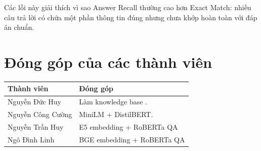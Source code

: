 \documentclass[12pt,a4paper]{report}
\begin{document}
Các lỗi này giải thích vì sao Answer Recall thường cao hơn Exact Match: nhiều câu trả lời có chứa một phần thông tin đúng nhưng chưa khớp hoàn toàn với đáp án chuẩn.















\newpage
\section*{Đóng góp của các thành viên}

\begin{table}[h]
\centering
\begin{tabular}{|l|p{10cm}|}
\hline
\textbf{Thành viên} & \textbf{Đóng góp} \\
\hline
Nguyễn Đức Huy & Làm knowledge base . \\
\hline
Nguyễn Công Cường & MiniLM + DistilBERT. \\
\hline
Nguyễn Trần Huy & E5 embedding + RoBERTa QA  \\
\hline
Ngô Đình Linh & BGE embedding + RoBERTa QA  \\
\hline
\end{tabular}
\end{table}
\end{document}
